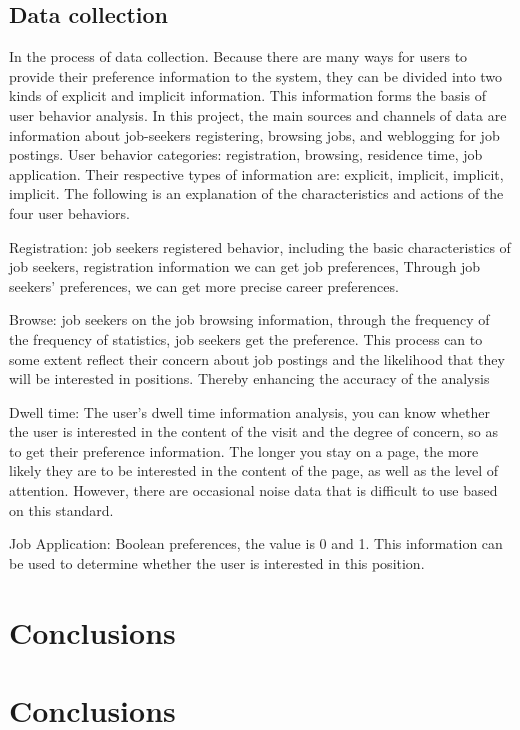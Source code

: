 \documentclass[sigconf]{acmart}
\begin{document}
\subsection{Data collection}
In the process of data collection. Because there are many ways for users to provide their preference information to the system, they can be divided into two kinds of explicit and implicit information. This information forms the basis of user behavior analysis. In this project, the main sources and channels of data are information about job-seekers registering, browsing jobs, and weblogging for job postings. User behavior categories: registration, browsing, residence time, job application. Their respective types of information are: explicit, implicit, implicit, implicit. The following is an explanation of the characteristics and actions of the four user behaviors.
\par Registration: job seekers registered behavior, including the basic characteristics of job seekers, registration information we can get job preferences,
Through job seekers' preferences, we can get more precise career preferences.
\par Browse: job seekers on the job browsing information, through the frequency of the frequency of statistics, job seekers get the preference. This process can to some extent reflect their concern about job postings and the likelihood that they will be interested in positions. Thereby enhancing the accuracy of the analysis
\par Dwell time: The user's dwell time information analysis, you can know whether the user is interested in the content of the visit and the degree of concern, so as to get their preference information. The longer you stay on a page, the more likely they are to be interested in the content of the page, as well as the level of attention. However, there are occasional noise data that is difficult to use based on this standard.
\par Job Application: Boolean preferences, the value is 0 and 1. This information can be used to determine whether the user is interested in this position.



\section{Conclusions}



\section{Conclusions}
 





 
\end{document}
